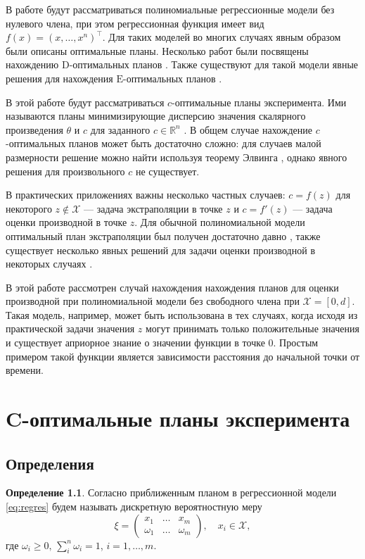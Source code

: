 \documentclass[specialist,
               substylefile = spbu.rtx,
               subf,href,colorlinks=true, 12pt]{disser}
\theoremstyle{definition}
\newtheorem{definition}{Определение}
\begin{document}
  В работе будут рассматриваться полиномиальные регрессионные модели без нулевого члена, при этом регрессионная функция имеет вид $f(x) = (x, \ldots, x^n)^\top$. Для таких моделей во многих случаях явным образом были описаны оптимальные планы. Несколько работ были посвящены нахождению $\mathrm{D}$-оптимальных планов \cite{hoel1958, studden1980, dette1990, dette2001}. Также существуют для такой модели явные решения для нахождения $\mathrm{E}$-оптимальных планов \cite{pukelsheim1993, dette1993, heiligers1994, dette1993_2}.
  
  В этой работе будут рассматриваться $c$-оптимальные планы эксперимента. Ими называются планы минимизирующие дисперсию значения скалярного произведения $\theta$ и $c$ для заданного $c \in \mathbb{R}^n$ \cite{dette1993_2}. В общем случае нахождение $c$-оптимальных планов может быть достаточно сложно: для случаев малой размерности решение можно найти используя теорему Элвинга \cite{elfving1952}, однако явного решения для произвольного $c$ не существует.
  
  В практических приложениях важны несколько частных случаев: $c = f(z)$ для некоторого $z \notin \mathcal{X}$ --- задача экстраполяции в точке $z$ и $c = f'(z)$ --- задача оценки производной в точке $z$. Для обычной полиномиальной модели оптимальный план экстраполяции был получен достаточно давно \cite{hoel1964}, также существует несколько явных решений для задачи оценки производной в некоторых случаях \cite{melas2010, melasmain}.
  
  В этой работе рассмотрен случай нахождения нахождения планов для оценки производной при полиномиальной модели без свободного члена при $\mathcal{X} = [0, d]$. Такая модель, например, может быть использована в тех случаях, когда исходя из практической задачи значения $z$ могут принимать только положительные значения и существует априорное знание о значении функции в точке 0. Простым примером такой функции является зависимости расстояния до начальной точки от времени.
  
  
  

\chapter{C-оптимальные планы эксперимента}

\section{Определения}

  \begin{definition}
  Согласно \cite{kiefer1974} приближенным планом в регрессионной модели \eqref{eq:regres} будем называть дискретную вероятностную меру
  \begin{equation*}
    \xi = 
      \begin{pmatrix}
        x_1 & \ldots & x_m \\
        \omega_1 & \ldots & \omega_m
      \end{pmatrix}, \quad x_i \in \mathcal{X},
  \end{equation*}
   где $\omega_i \geqslant 0, \, \sum_i^n \omega_i = 1$, $i = 1, \ldots, m$.
  \end{definition}
\end{document}
